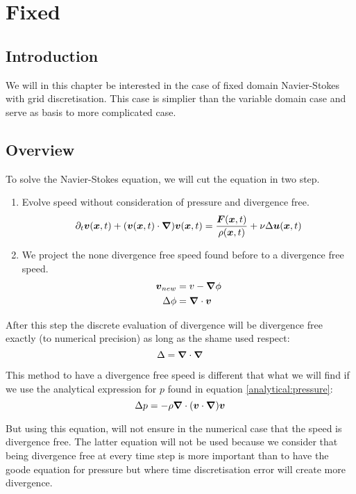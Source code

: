\chapter{Fixed}
\minitoc
\section{Introduction}

We will in this chapter be interested in the case of fixed domain Navier-Stokes with grid discretisation.
This case is simplier than the variable domain case and serve as basis to more complicated case.

\section{Overview}

To solve the Navier-Stokes equation, we will cut the equation in two step.
\begin{enumerate}
 \item Evolve speed without consideration of pressure and divergence free.
  \begin{equation}
   \partial_t {\boldsymbol {v}}({\boldsymbol {x}} ,t)+({\boldsymbol {v}}({\boldsymbol {x}},t)\cdot{\boldsymbol {\nabla}} ) {\boldsymbol {v}}({\boldsymbol {x}} ,t)=\frac{{\boldsymbol {F}}({\boldsymbol {x}},t)}{\rho({\boldsymbol {x}},t)}+\nu \Delta {\boldsymbol {u}}({\boldsymbol {x}},t)
  \end{equation}
 \item We project the none divergence free speed found before to a divergence free speed.
  \begin{align}
   {\boldsymbol {v}}_{new}&=v-{\boldsymbol {\nabla}}\phi\\
   \Delta \phi&={\boldsymbol {\nabla}} \cdot {\boldsymbol {v}}
  \end{align}
\end{enumerate}

After this step the discrete evaluation of divergence will be divergence free exactly (to numerical precision) as long as the shame used respect:
\begin{equation}
 \Delta={\boldsymbol {\nabla}}\cdot {\boldsymbol {\nabla}}
\end{equation}

\begin{rem}
 This method to have a divergence free speed is different that what we will find if we use the analytical expression for $p$ found in equation \ref{analytical:pressure}:
 \begin{equation}
  \Delta p=-\rho {\boldsymbol {\nabla}} \cdot ({\boldsymbol {v}}\cdot {\boldsymbol {\nabla}}) {\boldsymbol {v}}
 \end{equation}
 
 But using this equation, will not ensure in the numerical case that the speed is divergence free.
 The latter equation will not be used because we consider that being divergence free at every time step is more important than
 to have the goode equation for pressure but where time discretisation error will create more divergence.
\end{rem}

